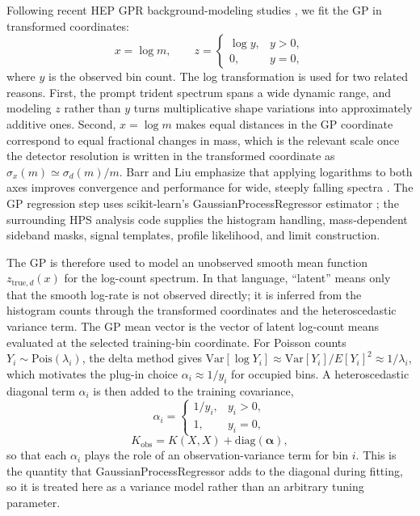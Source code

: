 Following recent HEP GPR background-modeling studies
\cite{BarrLiu2025,Gandrakota2023}, we fit the GP in transformed coordinates:
\begin{equation}
x = \log m,
\qquad
z =
\begin{cases}
\log y, & y>0, \\
0, & y=0,
\end{cases}
\end{equation}
where $y$ is the observed bin count. The log transformation is used for two related
reasons. First, the prompt trident spectrum spans a wide dynamic range, and modeling
$z$ rather than $y$ turns multiplicative shape variations into approximately additive
ones. Second, $x=\log m$ makes equal distances in the GP coordinate correspond to equal
fractional changes in mass, which is the relevant scale once the detector resolution is
written in the transformed coordinate as $\sigma_x(m)\simeq \sigma_d(m)/m$. Barr and
Liu emphasize that applying logarithms to both axes improves convergence and
performance for wide, steeply falling spectra \cite{BarrLiu2025}.
The GP regression step uses scikit-learn's GaussianProcessRegressor estimator
\cite{ScikitLearn}; the surrounding HPS analysis code supplies the histogram
handling, mass-dependent sideband masks, signal templates, profile likelihood,
and \CLs{} limit construction.

The GP is therefore used to model an unobserved smooth mean function
$z_{\mathrm{true},d}(x)$ for the log-count spectrum. In that language, ``latent'' means
only that the smooth log-rate is not observed directly; it is inferred from the
histogram counts through the transformed coordinates and the heteroscedastic variance
term. The GP mean vector is the vector of latent log-count means evaluated at the
selected training-bin coordinate. For Poisson counts $Y_i \sim
\mathrm{Pois}(\lambda_i)$, the delta method gives
$\mathrm{Var}[\log Y_i]\approx \mathrm{Var}[Y_i]/E[Y_i]^2 \approx 1/\lambda_i$, which
motivates the plug-in choice $\alpha_i\approx 1/y_i$ for occupied bins. A
heteroscedastic diagonal term $\alpha_i$ is then added to the training covariance,
\begin{equation}
\alpha_i =
\begin{cases}
1/y_i, & y_i > 0, \\
1, & y_i = 0,
\end{cases}
\label{eq:alpha-oney}
\end{equation}
\begin{equation}
K_{\mathrm{obs}} = K(X,X) + \mathrm{diag}(\bm{\alpha}),
\end{equation}
so that each $\alpha_i$ plays the role of an observation-variance term for bin $i$.
This is the quantity that GaussianProcessRegressor adds to the diagonal during fitting,
so it is treated here as a variance model rather than an arbitrary tuning parameter.

